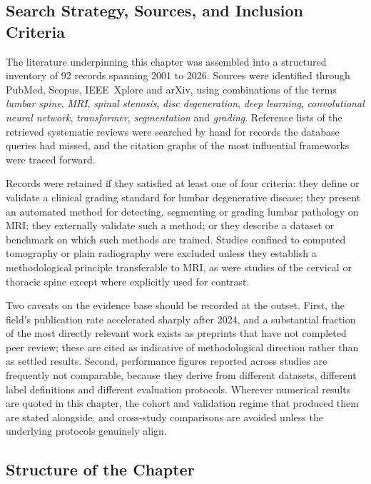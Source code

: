 \subsection{Search Strategy, Sources, and Inclusion Criteria}
\label{sec:lr-search}

The literature underpinning this chapter was assembled into a structured
inventory of 92 records spanning 2001 to 2026. Sources were identified through
PubMed, Scopus, IEEE~Xplore and arXiv, using combinations of the terms
\emph{lumbar spine}, \emph{MRI}, \emph{spinal stenosis}, \emph{disc
degeneration}, \emph{deep learning}, \emph{convolutional neural network},
\emph{transformer}, \emph{segmentation} and \emph{grading}. Reference lists of
the retrieved systematic reviews \cite{compte2023are,wang2024machine,liawrungrueang2025artificial,mendes2026deep}
were searched by hand for records the database queries had missed, and the
citation graphs of the most influential frameworks were traced forward.

Records were retained if they satisfied at least one of four criteria: they
define or validate a clinical grading standard for lumbar degenerative disease;
they present an automated method for detecting, segmenting or grading lumbar
pathology on MRI; they externally validate such a method; or they describe a
dataset or benchmark on which such methods are trained. Studies confined to
computed tomography or plain radiography were excluded unless they establish a
methodological principle transferable to MRI, as were studies of the cervical
or thoracic spine except where explicitly used for contrast.

Two caveats on the evidence base should be recorded at the outset. First, the
field's publication rate accelerated sharply after 2024, and a substantial
fraction of the most directly relevant work
\cite{batra2025mscan,acharya2026disccentric,nguyen2026crossspine,islamsk2026an}
exists as preprints that have not completed peer review; these are cited as
indicative of methodological direction rather than as settled results. Second,
performance figures reported across studies are frequently not comparable,
because they derive from different datasets, different label definitions and
different evaluation protocols. Wherever numerical results are quoted in this
chapter, the cohort and validation regime that produced them are stated
alongside, and cross-study comparisons are avoided unless the underlying
protocols genuinely align.

\subsection{Structure of the Chapter}
\label{sec:lr-structure}

